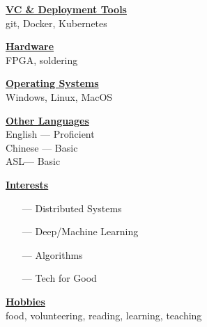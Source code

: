 \documentclass{WeiAndrew}
\begin{document}
{\begin{minipage}[t][\textheight-2\fboxsep-2\fboxrule][t]{0.25\textwidth}
        \textbf{\underline{VC \& Deployment Tools}} \\
        git, Docker, Kubernetes
        \vspace{12px}

        \textbf{\underline{Hardware}} \\
        FPGA, soldering
        \vspace{12px}

        \textbf{\underline{Operating Systems}} \\
        Windows, Linux, MacOS
        \vspace{12px}

        \textbf{\underline{Other Languages}} \\
        English --- Proficient \\
        Chinese --- Basic      \\
        ASL\nobreakspace\nobreakspace\nobreakspace\nobreakspace\nobreakspace --- Basic      \\
        \vspace{12px}

        \textbf{\underline{Interests}} \\
        \begin{itemize}[leftmargin=4mm]
            \item[---] Distributed Systems
            \item[---] Deep/Machine Learning
            \item[---] Algorithms
            \item[---] Tech for Good
        \end{itemize}
        \vspace{12px}

        \textbf{\underline{Hobbies}} \\
        food, volunteering, reading, learning, teaching
    \end{minipage}%
    \hspace{0.01\textwidth}
}%
\end{document}
